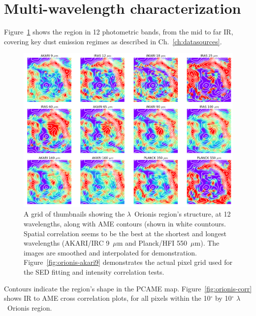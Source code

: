 		\section{Multi-wavelength characterization}
			Figure~\ref{fig:orionis-img} shows the region in 12 photometric bands, from the mid to far IR, covering key dust emission regimes as described in Ch.~\ref{ch:datasources}.
        \begin{figure}
          \includegraphics[width=\textwidth]{../Plots/lOrionis_grid_img.png}
          \centering
          \caption{A grid of thumbnails showing the $\lambda$~Orionis region's structure, at 12 wavelengths, along with AME contours (shown in white countours. Spatial correlation seems to be the best at the shortest and longest wavelengths (AKARI/IRC 9~$\mu$m and Planck/HFI 550~$\mu$m). The images are smoothed and interpolated for demonstration. Figure~\ref{fig:orionis-akari9} demonstrates the actual pixel grid used for the SED fitting and intensity correlation tests.}
          \label{fig:orionis-img}
        \end{figure}
			Contours indicate the region's shape in the PCAME map. Figure~\ref{fig:orionis-corr} shows IR to AME cross correlation plots, for all pixels within the 10$^{\circ}$ by 10$^{\circ}$ $\lambda$~Orionis region.
